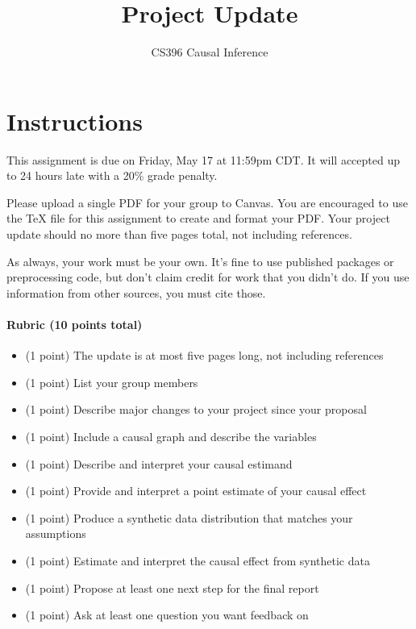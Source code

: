 \documentclass[12pt]{article}
\title{Project Update}
\author{CS396 Causal Inference}
\begin{document}
\maketitle

\section*{Instructions}

This assignment is due on Friday, May 17 at 11:59pm CDT. It will accepted up to
24 hours late with a 20\% grade penalty.

Please upload a single PDF for your group to Canvas. You are encouraged to use
the TeX file for this assignment to create and format your PDF. Your project
update should no more than five pages total, not including references. 

As always, your work must be your own. It's fine to use published packages or
preprocessing code, but don't claim credit for work that you didn't do. If you
use information from other sources, you must cite those.

\paragraph{Rubric (10 points total)}

\begin{itemize}
\item (1 point) The update is at most five pages long, not including references
\item (1 point) List your group members
\item (1 point) Describe major changes to your project since your proposal
\item (1 point) Include a causal graph and describe the variables
\item (1 point) Describe and interpret your causal estimand
\item (1 point) Provide and interpret a point estimate of your causal effect
\item (1 point) Produce a synthetic data distribution that matches your assumptions
\item (1 point) Estimate and interpret the causal effect from synthetic data
\item (1 point) Propose at least one next step for the final report
\item (1 point) Ask at least one question you want feedback on
\end{itemize}
\end{document}
